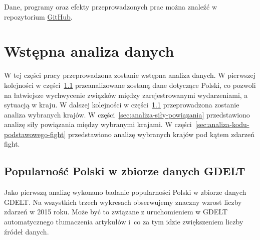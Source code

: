\documentclass[11pt]{report}
\begin{document}
    Dane, programy oraz efekty przeprowadzonych prac można znaleźć w repozytorium \href{https://github.com/mijapa/GDELT}{GitHub}.


    \chapter{Wstępna analiza danych}\label{ch:wstępna-analiza-danych}
    W tej części pracy przeprowadzona zostanie wstępna analiza danych.
    W pierwszej kolejności w części~\ref{sec:popularność-polski-w-zbiorze-danych-gdelt} przeanalizowane zostaną dane dotyczące Polski, co pozwoli na łatwiejsze wychwycenie związków między zarejestrowanymi wydarzeniami, a sytuacją w kraju.
    W dalszej kolejności w części~\ref{sec:popularność-polski-w-zbiorze-danych-gdelt} przeprowadzona zostanie analiza wybranych krajów.
    W części~\ref{sec:analiza-siły-powiązania} przedstawiono analizę siły powiązania między wybranymi krajami.
    W części~\ref{sec:analiza-kodu-podstawowego-fight} przedstawiono analizę wybranych krajów pod kątem zdarzeń fight.


    \section{Popularność Polski w zbiorze danych GDELT}\label{sec:popularność-polski-w-zbiorze-danych-gdelt}
    Jako pierwszą analizę wykonano badanie popularności Polski w zbiorze danych GDELT. Na wszystkich trzech wykresach obserwujemy znaczny wzrost liczby zdarzeń w 2015 roku. Może być to związane z uruchomieniem w GDELT automatycznego tłumaczenia artykułów i~co za tym idzie zwiększeniem liczby źródeł danych.
\end{document}
